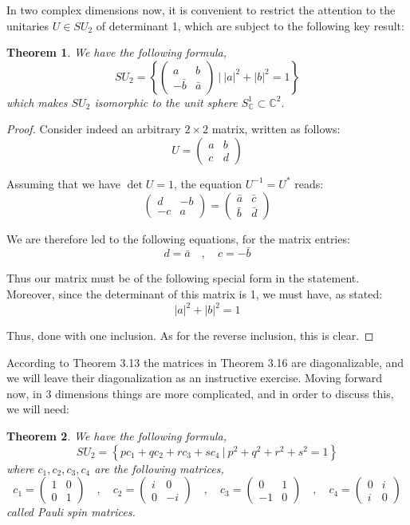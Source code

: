 \documentclass[12pt]{amsbook}
\newtheorem{theorem}{Theorem}[chapter]
\begin{document}
In two complex dimensions now, it is convenient to restrict the attention to the unitaries $U\in SU_2$ of determinant 1, which are subject to the following key result:

\begin{theorem}
We have the following formula,
$$SU_2=\left\{\begin{pmatrix}a&b\\ -\bar{b}&\bar{a}\end{pmatrix}\ \Big|\ |a|^2+|b|^2=1\right\}$$
which makes $SU_2$ isomorphic to the unit sphere $S^1_\mathbb C\subset\mathbb C^2$.
\end{theorem}

\begin{proof}
Consider indeed an arbitrary $2\times 2$ matrix, written as follows:
$$U=\begin{pmatrix}a&b\\ c&d\end{pmatrix}$$

Assuming that we have $\det U=1$, the equation $U^{-1}=U^*$ reads:
$$\begin{pmatrix}d&-b\\ -c&a\end{pmatrix}
=\begin{pmatrix}\bar{a}&\bar{c}\\ \bar{b}&\bar{d}\end{pmatrix}$$

We are therefore led to the following equations, for the matrix entries:
$$d=\bar{a}\quad,\quad 
c=-\bar{b}$$

Thus our matrix must be of the following special form in the statement. Moreover, since the determinant of this matrix is 1, we must have, as stated:
$$|a|^2+|b|^2=1$$

Thus, done with one inclusion. As for the reverse inclusion, this is clear.
\end{proof}

According to Theorem 3.13 the matrices in Theorem 3.16 are diagonalizable, and we will leave their diagonalization as an instructive exercise. Moving forward now, in 3 dimensions things are more complicated, and in order to discuss this, we will need:

\begin{theorem}
We have the following formula,
$$SU_2=\left\{pc_1+qc_2+rc_3+sc_4\ \Big|\ p^2+q^2+r^2+s^2=1\right\}$$
where $c_1,c_2,c_3,c_4$ are the following matrices,
$$c_1=\begin{pmatrix}1&0\\ 0&1\end{pmatrix}\quad,\quad
c_2=\begin{pmatrix}i&0\\ 0&-i\end{pmatrix}\quad,\quad
c_3=\begin{pmatrix}0&1\\ -1&0\end{pmatrix}\quad,\quad 
c_4=\begin{pmatrix}0&i\\ i&0\end{pmatrix}$$
called Pauli spin matrices.
\end{theorem}
\end{document}
